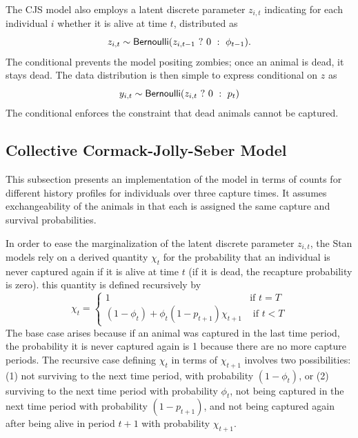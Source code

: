 The CJS model also employs a latent discrete parameter $z_{i,t}$
indicating for each individual $i$ whether it is alive at time $t$,
distributed as
%
\[
z_{i,t} \sim \mbox{\sf Bernoulli}(z_{i,t-1} \ ? \ 0 \ : \ \phi_{t-1}).
\]
%
The conditional prevents the model positing zombies; once an animal is
dead, it stays dead.  The data distribution is then simple to express
conditional on $z$ as
%
\[
y_{i,t} \sim \mbox{\sf Bernoulli}(z_{i,t} \ ? \ 0 \ : \ p_t)
\]
%
The conditional enforces the constraint that dead animals cannot be captured.


\subsection{Collective Cormack-Jolly-Seber Model}

This subsection presents an implementation of the model in terms of
counts for different history profiles for individuals over three
capture times. It assumes exchangeability of the animals in that each
is assigned the same capture and survival probabilities.

In order to ease the marginalization of the latent discrete parameter
$z_{i,t}$, the Stan models rely on a derived quantity $\chi_t$ for
the probability that an individual is never captured again if it is
alive at time $t$ (if it is dead, the recapture probability is zero).
this quantity is defined recursively by
\[
\chi_t
=
\begin{cases}
1
& \mbox{if } t = T
\\[3pt]
(1 - \phi_t) + \phi_t (1 - p_{t+1}) \chi_{t+1}
& \mbox{ if } t < T
\end{cases}
\]
%
The base case arises because if an animal was captured in the last
time period, the probability it is never captured again is 1 because
there are no more capture periods.  The recursive case defining
$\chi_{t}$ in terms of $\chi_{t+1}$ involves two possibilities: (1)
not surviving to the next time period, with probability $(1 -
\phi_t)$, or (2) surviving to the next time period with probability
$\phi_t$, not being captured in the next time period with probability
$(1 - p_{t+1})$, and not being captured again after being alive in
period $t+1$ with probability $\chi_{t+1}$.

